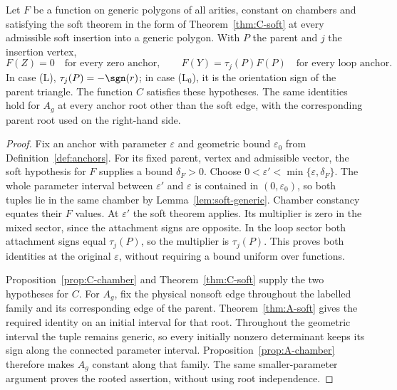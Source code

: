 \begin{proposition}\label{prop:anchor-values}\leanok
Let $F$ be a function on generic polygons of all arities, constant
on chambers and satisfying the soft theorem in the form of
Theorem~\ref{thm:C-soft} at every admissible soft insertion into
a generic polygon. With $P$ the parent and $j$ the insertion vertex,
\[
F(Z)=0\quad\text{for every zero anchor},\qquad
F(Y)=\tau_j(P)F(P)\quad\text{for every loop anchor}.
\]
In case (L), $\tau_j(P)=-\sgn(r)$; in case (L$_0$), it is the
orientation sign of the parent triangle. The function $C$ satisfies
these hypotheses. The same identities hold for $A_g$ at every
anchor root other than the soft edge, with the corresponding
parent root used on the right-hand side.

\end{proposition}
\begin{proof}\leanok{}
Fix an anchor with parameter $\varepsilon$ and geometric bound
$\varepsilon_0$ from Definition~\ref{def:anchors}. For its fixed
parent, vertex and admissible vector, the soft hypothesis for $F$
supplies a bound $\delta_F>0$. Choose
$0<\varepsilon'<\min\{\varepsilon,\delta_F\}$.
The whole parameter interval between $\varepsilon'$ and
$\varepsilon$ is contained in $(0,\varepsilon_0)$, so both tuples
lie in the same chamber by Lemma~\ref{lem:soft-generic}.
Chamber constancy equates their $F$ values. At $\varepsilon'$ the
soft theorem applies. Its multiplier is zero in the mixed sector,
since the attachment signs are opposite. In the loop sector both
attachment signs equal $\tau_j(P)$, so the multiplier is
$\tau_j(P)$. This proves both identities at the original
$\varepsilon$, without requiring a bound uniform over functions.

Proposition~\ref{prop:C-chamber} and Theorem~\ref{thm:C-soft}
supply the two hypotheses for $C$. For $A_g$, fix the physical
nonsoft edge throughout the labelled family and its corresponding
edge of the parent. Theorem~\ref{thm:A-soft} gives the required
identity on an initial interval for that root. Throughout the
geometric interval the tuple remains generic, so every initially
nonzero determinant keeps its sign along the connected parameter
interval. Proposition~\ref{prop:A-chamber} therefore makes $A_g$
constant along that family. The same smaller-parameter argument
proves the rooted assertion, without using root independence.
\end{proof}

